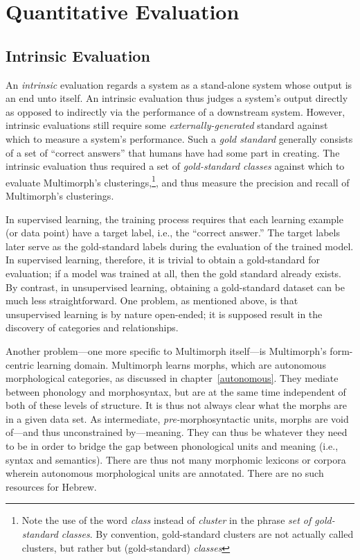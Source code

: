 \section{Quantitative Evaluation}
\subsection{Intrinsic Evaluation}
\label{sec:intrinsic}
An \emph{intrinsic} evaluation regards a system as a stand-alone system whose output is an end unto itself. An intrinsic evaluation thus judges a system's output directly as opposed to indirectly via the performance of a downstream system. However, intrinsic evaluations still require some \emph{externally-generated} standard against which to measure a system's performance. Such a \emph{gold standard} generally consists of a set of ``correct answers'' that humans have had some part in creating.
The intrinsic evaluation thus required a 
set of \emph{gold-standard classes} against which to evaluate 
Multimorph's clusterings,\footnote{Note the use of the word \emph{class} 
instead of \emph{cluster} in the phrase \emph{set of gold-standard classes}. 
By convention, gold-standard clusters are not actually called clusters, but rather 
but (gold-standard) \emph{classes}}, and thus measure the precision 
and recall of Multimorph's clusterings. 

In supervised learning, the training process requires that each learning example 
(or data point) have a target label, i.e., the ``correct answer.'' The target labels 
later serve as the gold-standard labels during the evaluation of the trained model. 
In supervised learning, therefore, it is trivial to obtain a gold-standard 
for evaluation; if a model was trained at all, then the gold standard 
already exists. By contrast, in unsupervised learning, obtaining a gold-standard 
dataset can be much less straightforward. One problem, as mentioned above, 
is that unsupervised learning is by nature open-ended; it is 
supposed result in the discovery of categories and relationships.  

Another problem---one more specific to Multimorph 
itself---is
Multimorph's form-centric learning domain. Multimorph learns morphs, 
which are autonomous morphological categories, as discussed in chapter~\ref{autonomous}. 
They mediate between phonology and morphosyntax, but are at the same time independent 
of both of these levels of structure. It is thus not always clear what the morphs are in a 
given data set. As intermediate, \emph{pre-}morphosyntactic units, morphs are void 
of---and thus unconstrained by---meaning. They can thus
be whatever they need to be in order to bridge the gap between phonological units 
and meaning (i.e., syntax and semantics).  There are thus not many morphomic lexicons 
or corpora wherein autonomous morphological units are annotated. There are no 
such resources for Hebrew.

